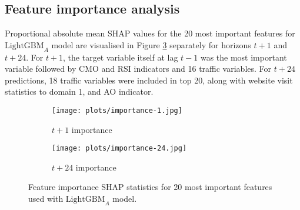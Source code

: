 \subsection{Feature importance analysis}
Proportional absolute mean SHAP values for the 20 most important features for $\text{LightGBM}_A$ model are visualised in Figure \ref{fig:importance} separately for horizons $t+1$ and $t+24$. For $t+1$, the target variable itself at lag $t-1$ was the most important variable followed by CMO and RSI indicators and 16 traffic variables. For $t+24$ predictions, 18 traffic variables were included in top 20, along with website visit statistics to domain 1, and AO indicator.

\begin{figure}[H]
    \centering
    \begin{subfigure}[b]{0.49\textwidth}
        \texttt{[image: plots/importance-1.jpg]}
        \caption{$t+1$ importance}
        \label{fig:importance-1}
    \end{subfigure}
    \begin{subfigure}[b]{0.49\textwidth}
        \texttt{[image: plots/importance-24.jpg]}
        \caption{$t+24$ importance}
        \label{fig:importance-24}
    \end{subfigure}
    \caption{Feature importance SHAP statistics for 20 most important features used with $\text{LightGBM}_A$ model.}
    \label{fig:importance}
\end{figure}
